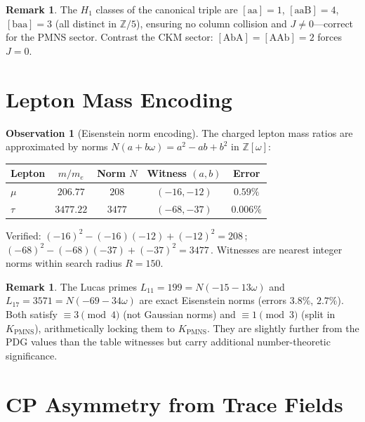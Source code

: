 \documentclass[11pt,a4paper]{article}
\theoremstyle{definition}
\newtheorem{observation}[theorem]{Observation}
\newtheorem{remark}[theorem]{Remark}
\newcommand{\KPMNS}{K_{\mathrm{PMNS}}}
\newcommand{\Zom}{\mathbb{Z}[\omega]}
\newcommand{\Zfive}{\mathbb{Z}/5}
\begin{document}
\begin{remark}
The $H_1$ classes of the canonical triple are
$[\mathrm{aa}]=1$, $[\mathrm{aaB}]=4$, $[\mathrm{baa}]=3$
(all distinct in $\Zfive$), ensuring no column collision
and $J\neq0$---correct for the PMNS sector.
Contrast the CKM sector: $[\mathrm{AbA}]=[\mathrm{AAb}]=2$
forces $J=0$.
\end{remark}

\section{Lepton Mass Encoding}
\label{sec:masses}

\begin{observation}[Eisenstein norm encoding]
The charged lepton mass ratios are approximated by norms
$N(a+b\omega)=a^2-ab+b^2$ in $\Zom$:

\begin{center}
\begin{tabular}{lcccc}
\toprule
Lepton & $m/m_e$ & Norm $N$ & Witness $(a,b)$ & Error \\
\midrule
$\mu$ & $206.77$ & $208$ & $(-16,-12)$ & $0.59\%$ \\
$\tau$ & $3477.22$ & $3477$ & $(-68,-37)$ & $0.006\%$ \\
\bottomrule
\end{tabular}
\end{center}

Verified: $(-16)^2-(-16)(-12)+(-12)^2=208$\,\checkmark;
$(-68)^2-(-68)(-37)+(-37)^2=3477$\,\checkmark.
Witnesses are nearest integer norms within search radius $R=150$.
\end{observation}

\begin{remark}
The Lucas primes $L_{11}=199=N(-15-13\omega)$ and
$L_{17}=3571=N(-69-34\omega)$ are exact Eisenstein norms
(errors $3.8\%$, $2.7\%$).
Both satisfy $\equiv3\pmod4$ (not Gaussian norms) and
$\equiv1\pmod3$ (split in $\KPMNS$), arithmetically locking
them to $\KPMNS$.
They are slightly further from the PDG values than the
table witnesses but carry additional number-theoretic significance.
\end{remark}

\section{CP Asymmetry from Trace Fields}
\label{sec:trace_fields}
\end{document}
